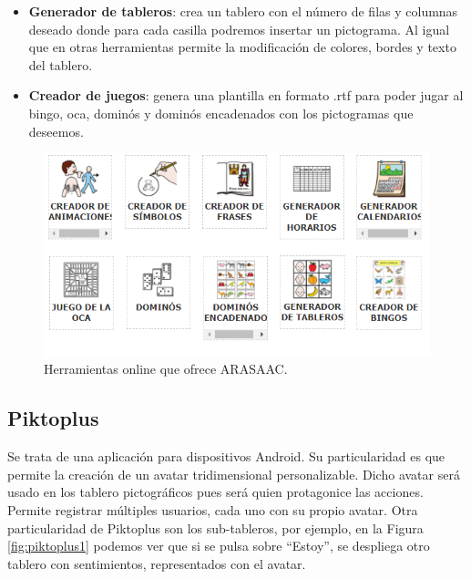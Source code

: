 \begin{itemize}
\item \textbf{Generador de tableros}: crea un tablero con el número de filas y columnas deseado donde para cada casilla podremos insertar un pictograma. Al igual que en otras herramientas permite la modificación de colores, bordes y  texto del tablero.

\item \textbf{Creador de juegos}: genera una plantilla en formato .rtf para poder jugar al bingo, oca, dominós y dominós encadenados con los pictogramas que deseemos.
\end{itemize}

\begin{figure}[h!]
	\centering
	\includegraphics[width=0.7\linewidth]{Imagenes/Bitmap/Tableros ARASAAC}
	\caption[Tableros web ARASAAC]{Herramientas online que ofrece ARASAAC.}
	\label{fig:tableros-arasaac}
\end{figure}

\newpage
\subsection{Piktoplus}
Se trata de una aplicación para dispositivos Android. Su particularidad es que permite la creación de un avatar tridimensional personalizable. Dicho avatar será usado en los tablero pictográficos pues será quien protagonice las acciones. Permite registrar múltiples usuarios, cada uno con su propio avatar. Otra particularidad de Piktoplus son los sub-tableros, por ejemplo, en la Figura \ref{fig:piktoplus1} podemos ver que si se pulsa sobre “Estoy”, se despliega otro tablero con sentimientos, representados con el avatar.

